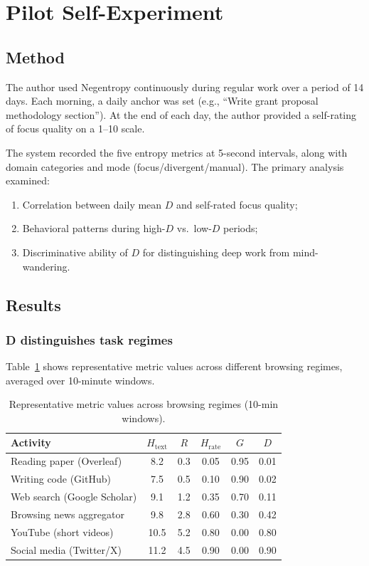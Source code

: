 \documentclass[10pt,letterpaper]{article}
\begin{document}
\section{Pilot Self-Experiment}
\label{sec:pilot}

\subsection{Method}

The author used Negentropy continuously during regular work over a period of 14 days. Each morning, a daily anchor was set (e.g., ``Write grant proposal methodology section''). At the end of each day, the author provided a self-rating of focus quality on a 1--10 scale.

The system recorded the five entropy metrics at 5-second intervals, along with domain categories and mode (focus/divergent/manual). The primary analysis examined:

\begin{enumerate}[noitemsep]
    \item Correlation between daily mean $D$ and self-rated focus quality;
    \item Behavioral patterns during high-$D$ vs.\ low-$D$ periods;
    \item Discriminative ability of $D$ for distinguishing deep work from mind-wandering.
\end{enumerate}

\subsection{Results}

\subsubsection{D distinguishes task regimes}

Table~\ref{tab:regimes} shows representative metric values across different browsing regimes, averaged over 10-minute windows.

\begin{table}[t]
\centering
\caption{Representative metric values across browsing regimes (10-min windows).}
\label{tab:regimes}
\small
\begin{tabular}{@{}lccccc@{}}
\toprule
\textbf{Activity} & $H_{\text{text}}$ & $R$ & $H_{\text{rate}}$ & $G$ & $D$ \\
\midrule
Reading paper (Overleaf) & 8.2 & 0.3 & 0.05 & 0.95 & 0.01 \\
Writing code (GitHub) & 7.5 & 0.5 & 0.10 & 0.90 & 0.02 \\
Web search (Google Scholar) & 9.1 & 1.2 & 0.35 & 0.70 & 0.11 \\
Browsing news aggregator & 9.8 & 2.8 & 0.60 & 0.30 & 0.42 \\
YouTube (short videos) & 10.5 & 5.2 & 0.80 & 0.00 & 0.80 \\
Social media (Twitter/X) & 11.2 & 4.5 & 0.90 & 0.00 & 0.90 \\
\bottomrule
\end{tabular}
\end{table}
\end{document}

